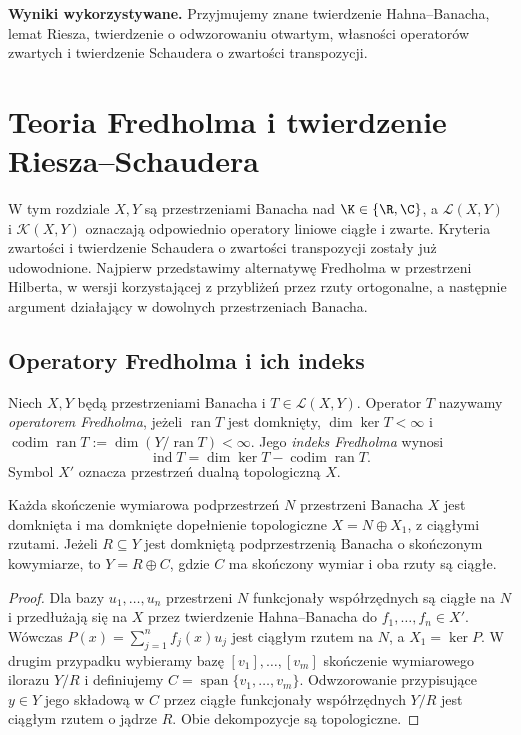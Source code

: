 \setcounter{section}{29}
\noindent\textbf{Wyniki wykorzystywane.} Przyjmujemy znane twierdzenie Hahna--Banacha,
lemat Riesza, twierdzenie o odwzorowaniu otwartym, własności operatorów
zwartych i twierdzenie Schaudera o zwartości transpozycji.
\par\medskip

\section{Teoria Fredholma i twierdzenie Riesza--Schaudera}
\label{sec:fredholm30}

W tym rozdziale $X,Y$ są przestrzeniami Banacha nad
$\K\in\{\R,\C\}$, a $\mathcal L(X,Y)$ i $\mathcal K(X,Y)$
oznaczają odpowiednio operatory liniowe ciągłe i zwarte.
Kryteria zwartości i twierdzenie Schaudera o zwartości transpozycji
zostały już udowodnione. Najpierw przedstawimy alternatywę
Fredholma w przestrzeni Hilberta, w wersji korzystającej z
przybliżeń przez rzuty ortogonalne, a następnie argument
działający w dowolnych przestrzeniach Banacha.

\subsection{Operatory Fredholma i ich indeks}

\begin{definicja}
\label{def:fredholm30}
Niech $X,Y$ będą przestrzeniami Banacha i $T\in\mathcal L(X,Y)$.
Operator $T$ nazywamy \emph{operatorem Fredholma}, jeżeli
$\operatorname{ran}T$ jest domknięty, $\dim\ker T<\infty$ i
$\operatorname{codim}\operatorname{ran}T:=\dim(Y/\operatorname{ran}T)<\infty$.
Jego \emph{indeks Fredholma} wynosi
\[\operatorname{ind}T=\dim\ker T-\operatorname{codim}\operatorname{ran}T.\]
Symbol $X'$ oznacza przestrzeń dualną topologiczną $X$.
\end{definicja}

\begin{lemat}
\label{lem:fredholm-complements30}
Każda skończenie wymiarowa podprzestrzeń $N$ przestrzeni Banacha
$X$ jest domknięta i ma domknięte dopełnienie topologiczne
$X=N\oplus X_1$, z ciągłymi rzutami. Jeżeli $R\subseteq Y$
jest domkniętą podprzestrzenią Banacha o skończonym kowymiarze,
to $Y=R\oplus C$, gdzie $C$ ma skończony wymiar i oba rzuty
są ciągłe.
\end{lemat}
\begin{proof}
Dla bazy $u_1,\ldots,u_n$ przestrzeni $N$ funkcjonały
współrzędnych są ciągłe na $N$ i przedłużają się na $X$
przez twierdzenie Hahna--Banacha do $f_1,\ldots,f_n\in X'$.
Wówczas $P(x)=\sum_{j=1}^n f_j(x)u_j$ jest ciągłym rzutem
na $N$, a $X_1=\ker P$. W drugim przypadku wybieramy bazę
$[v_1],\ldots,[v_m]$ skończenie wymiarowego ilorazu $Y/R$
i definiujemy $C=\operatorname{span}\{v_1,\ldots,v_m\}$.
Odwzorowanie przypisujące $y\in Y$ jego składową w $C$
przez ciągłe funkcjonały współrzędnych $Y/R$ jest ciągłym
rzutem o jądrze $R$. Obie dekompozycje są topologiczne.
\end{proof}

